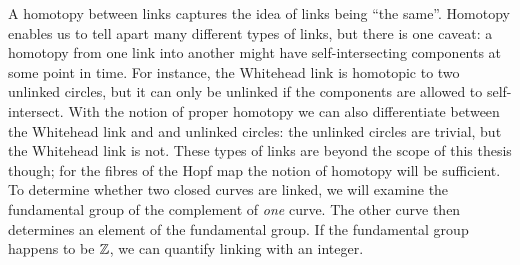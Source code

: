 A homotopy between links captures the idea of links being “the same”.
Homotopy enables us to tell apart many different types of links,
but there is one caveat:
a homotopy from one link into another might have self-intersecting components
at some point in time.
For instance, the Whitehead link is homotopic to two unlinked circles,
but it can only be unlinked if the components are allowed to self-intersect.
With the notion of proper homotopy we can also differentiate between
the Whitehead link and and unlinked circles:
the unlinked circles are trivial,
but the Whitehead link is not.
These types of links are beyond the scope of this thesis though;
for the fibres of the Hopf map
the notion of homotopy will be sufficient.
To determine whether two closed curves are linked,
we will examine the fundamental group of the complement of \emph{one} curve.
The other curve then determines an element of the fundamental group.
If the fundamental group happens to be $\mathbb{Z}$,
we can quantify linking with an integer.

